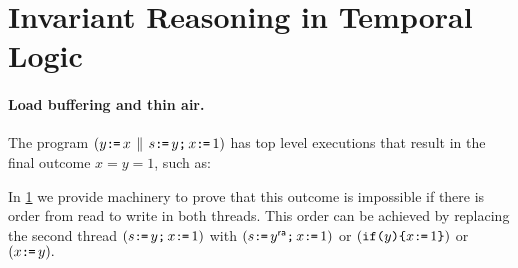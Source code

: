 \section{Invariant Reasoning in Temporal Logic}
\label{sec:logic}

\paragraph{Load buffering and thin air.}
The program
\begin{math}
  (y\texttt{:}\mkern-1mu\texttt{=}\, x \,\mathbin{\|}\, s\texttt{:}\mkern-1mu\texttt{=}\, y\texttt{;}\,\allowbreak x\texttt{:}\mkern-1mu\texttt{=}\,1)
\end{math}
has top level executions that result in the final outcome $x = y = 1$, such as:
\begin{tikzdisplay}[node distance=1em]
\end{tikzdisplay}
In \textsection\ref{sec:logic} we provide machinery to prove that this
outcome is impossible if there is order from read to write in both
threads.  This order can be achieved by replacing the second thread
\begin{math}
  (s\texttt{:}\mkern-1mu\texttt{=}\, y\texttt{;}\,\allowbreak x\texttt{:}\mkern-1mu\texttt{=}\,1)
\end{math}
with 
\begin{math}
  (s\texttt{:}\mkern-1mu\texttt{=}\, y^{\mathsf{ra}}\texttt{;}\,\allowbreak x\texttt{:}\mkern-1mu\texttt{=}\,1)
\end{math}
or
\begin{math}
  (\texttt{if}\allowbreak\texttt{(}y\texttt{)}\allowbreak\texttt{\{} x\texttt{:}\mkern-1mu\texttt{=}\, 1\texttt{\}})
\end{math}
or
\begin{math}
  (x\texttt{:}\mkern-1mu\texttt{=}\, y).
\end{math}

